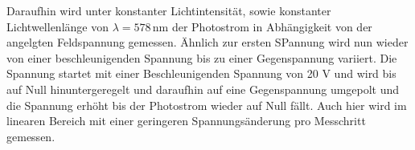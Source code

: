 \documentclass[titlepage = firstcover]{scrartcl}
\begin{document}
            \noindent
            Daraufhin wird unter konstanter Lichtintensität, sowie konstanter Lichtwellenlänge von $\lambda = 578 \, \text{nm}$ der Photostrom in Abhängigkeit von der angelgten Feldspannung gemessen.
            Ähnlich zur ersten SPannung wird nun wieder von einer beschleunigenden Spannung bis zu einer Gegenspannung variiert. Die Spannung startet mit einer Beschleunigenden Spannung von 20 V und 
            wird bis auf Null hinuntergeregelt und daraufhin auf eine Gegenspannung umgepolt und die Spannung erhöht bis der Photostrom wieder auf Null fällt. Auch hier wird im linearen Bereich mit 
            einer geringeren Spannungsänderung pro Messchritt gemessen.



    
\end{document}
